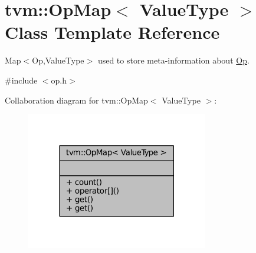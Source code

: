 \hypertarget{classtvm_1_1OpMap}{}\section{tvm\+:\+:Op\+Map$<$ Value\+Type $>$ Class Template Reference}
\label{classtvm_1_1OpMap}


Map$<$\+Op,\+Value\+Type$>$ used to store meta-\/information about \hyperlink{classtvm_1_1Op}{Op}.  




{\ttfamily \#include $<$op.\+h$>$}



Collaboration diagram for tvm\+:\+:Op\+Map$<$ Value\+Type $>$\+:
\nopagebreak
\begin{figure}[H]
\begin{center}
\leavevmode
\includegraphics[width=225pt]{classtvm_1_1OpMap__coll__graph}
\end{center}
\end{figure}
